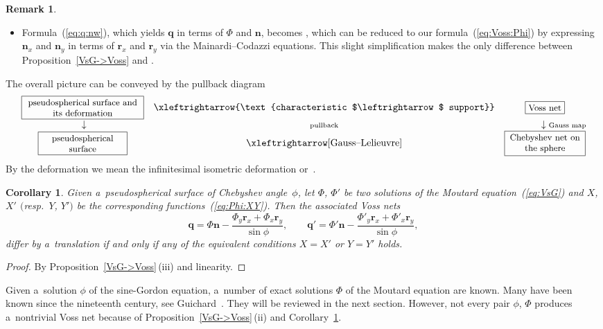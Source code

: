 \documentclass[pdftex]{sigma}
\let\ve\mathbf
\def\eqref#1{{\rm(\ref{#1})}}
\def\fpb#1#2{\fbox{\parbox{#2}{\small\centering #1}}}
\numberwithin{equation}{section}
\newtheorem{Corollary}[Theorem]{Corollary}
\theoremstyle{definition}
\newtheorem{Remark}[Theorem]{Remark}
\begin{document}
\begin{Remark}
\begin{itemize}
\item[(4)] Formula~\eqref{eq:q:nw},
which yields $\ve q$ in terms of $\Phi$ and $\ve n$,
becomes \hbox{\cite[equation~(24)]{Izm}},
which can be reduced to our formula~\eqref{eq:Voss:Phi} by expressing
$\ve n_x$ and $\ve n_y$ in terms of $\ve r_x$ and $\ve r_y$ via the
Mainardi--Codazzi equations.
This slight simplification makes the only difference between
Proposition~\ref{VsG->Voss} and \hbox{\cite[Theorem~2.25]{Izm}}.
\end{itemize}

The overall picture can be conveyed by the pullback diagram
$$
\def\fpb#1#2{\fbox{\parbox{#2}{\small\centering #1}}}
\begin{array}{ccccc}
\fpb{pseudospherical surface and its deformation}{4.2cm}
 & \xleftrightarrow{\text{characteristic $\leftrightarrow$ support}} & \fpb{Voss net}{1.2cm}
\\
\llap{\scriptsize }\downarrow
 & \hbox{\scriptsize pullback}
 & \downarrow \rlap{\scriptsize Gauss map}
\\
\fpb{pseudospherical surface}{3cm}
 & \xleftrightarrow[\text{Gauss--Lelieuvre}]{}
 & \fpb{Chebyshev net on the sphere}{2.7cm}
\end{array}
$$
By the deformation we mean the infinitesimal isometric deformation
\cite[Chapter~XV]{Bia-II}
or~\cite[Chapter~XI]{LPE-1909}.
\end{Remark}

\begin{Corollary}
\label{cor:Voss:PhiPhi'}
Given a~pseudospherical surface of Chebyshev angle~$\phi$,
let $\Phi$, $\Phi'$ be two solutions of the Moutard
equation~\eqref{eq:VsG} and
$X$, $X'$ $($resp.\ $Y$, $Y')$ be the corresponding functions~\eqref{eq:Phi:XY}.
Then the associated Voss nets
\[
\ve q = \Phi \ve n
 - \frac{\Phi_{y} \ve r_{x} + \Phi_{x} \ve r_{y}}{\sin\phi},
\qquad
\ve q' = \Phi' \ve n
 - \frac{\Phi'_{y} \ve r_{x} + \Phi'_{x} \ve r_{y}}{\sin\phi},
\]
differ by a~translation if and only if any of the equivalent conditions
$X = X'$ or $Y = Y'$ holds.
\end{Corollary}


\begin{proof}
By Proposition~\ref{VsG->Voss}\,(iii) and linearity.
\end{proof}


Given a~solution $\phi$ of the sine-Gordon equation, a~number of exact
solutions $\Phi$ of the Moutard equation are known.
Many have been known since the nineteenth century,
see Guichard~\cite{CG-1890b,CG-1890a}.
They will be reviewed in the next section.
However, not every pair $\phi$, $\Phi$ produces a~nontrivial Voss net
because of Proposition~\ref{VsG->Voss}\,(ii)
and Corollary~\ref{cor:Voss:PhiPhi'}.
\end{document}
